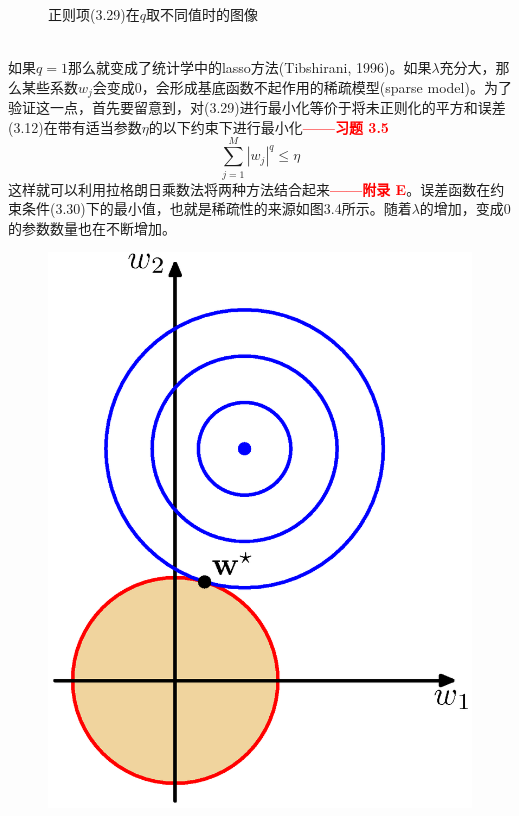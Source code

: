 \documentclass[b5paper]{book}
\numberwithin{equation}{chapter}
\begin{document}
{\begin{figure}[ht]
		\caption{正则项(3.29)在$q$取不同值时的图像}
		\label{fig:3-3}
	\end{figure}
	\\
	\indent 如果$q=1$那么就变成了统计学中的lasso方法(Tibshirani, 1996)。如果$\lambda$充分大，那么某些系数$w_j$会变成0，会形成基底函数不起作用的稀疏模型(sparse model)。为了验证这一点，首先要留意到，对(3.29)进行最小化等价于将未正则化的平方和误差(3.12)在带有适当参数$\eta$的以下约束下进行最小化\textcolor{red}{\textbf{——习题 3.5}}
	\begin{equation}
		\sum_{j=1}^M |w_j|^q \leqslant \eta
	\end{equation}
	这样就可以利用拉格朗日乘数法将两种方法结合起来\textcolor{red}{\textbf{——附录 E}}。误差函数在约束条件(3.30)下的最小值，也就是稀疏性的来源如图3.4所示。随着$\lambda$的增加，变成0的参数数量也在不断增加。
	\begin{figure}[ht]
		\begin{minipage}[t]{0.5\linewidth}
		\centering
		\includegraphics[scale=0.8]{Images/3-4a.png}

\end{minipage}
\end{figure}}
\end{document}
